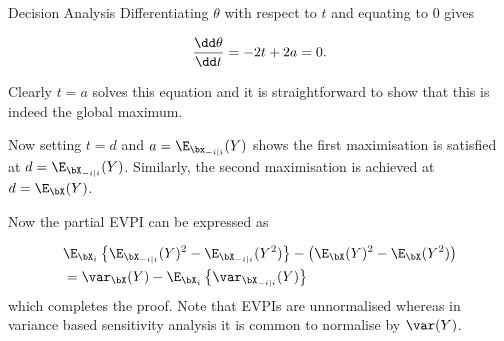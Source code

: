 \begin{chapter}{Decision Analysis \label{Ch:decision}}
Differentiating $\theta$ with respect to $t$ and equating to $0$ gives


\begin{equation}
\frac{\dd \theta}{\dd t} = -2t + 2a   = 0\\.
\end{equation}

Clearly $t = a$ solves this equation and it is straightforward to show that this is indeed the global maximum.

Now setting $t = d$ and $a = \E_{\bx_{-i|i}}(Y)$ shows the first maximisation is satisfied at $d = \E_{\bX_{-i|i}} (Y)$. Similarly, the second maximisation is achieved at $d = \E_{\bX} (Y)$.

Now the partial EVPI can be expressed as

\begin{align}
&\E_{\bX_i} \left\{ \E_{\bX_{-i|i}}(Y)^2 - \E_{\bX_{-i|i}}(Y^2) \right\} - \left(\E_{\bX}(Y)^2 - \E_{\bX}(Y^2)\right)\\
&= \var_{\bX}(Y) - \E_{\bX_i} \left\{ \var_{\bX_{-i|i}}(Y) \right\}
\end{align}
which completes the proof. Note that EVPIs are unnormalised whereas in variance based sensitivity analysis it is common to normalise by $\var(Y)$. 
\end{chapter}
